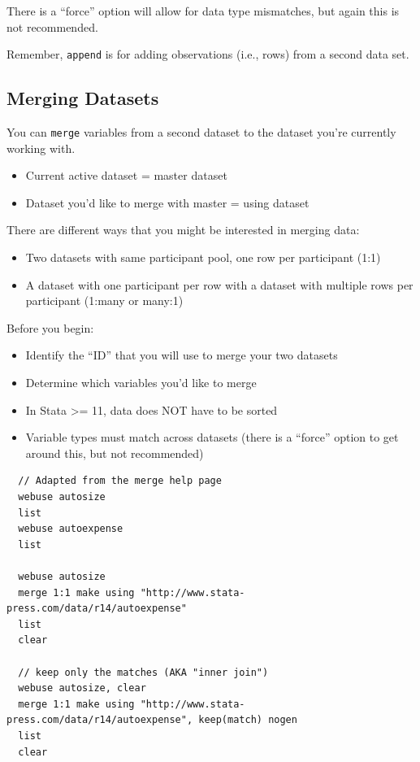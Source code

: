 \documentclass[]{book}
\providecommand{\tightlist}{%
  \setlength{\itemsep}{0pt}\setlength{\parskip}{0pt}}
\begin{document}
There is a ``force'' option will allow for data type mismatches, but
again this is not recommended.

Remember, \texttt{append} is for adding observations (i.e., rows) from a
second data set.

\subsection{Merging Datasets}\label{merging-datasets}

You can \texttt{merge} variables from a second dataset to the dataset
you're currently working with.

\begin{itemize}
\tightlist
\item
  Current active dataset = master dataset
\item
  Dataset you'd like to merge with master = using dataset
\end{itemize}

There are different ways that you might be interested in merging data:

\begin{itemize}
\tightlist
\item
  Two datasets with same participant pool, one row per participant (1:1)
\item
  A dataset with one participant per row with a dataset with multiple
  rows per participant (1:many or many:1)
\end{itemize}

Before you begin:

\begin{itemize}
\tightlist
\item
  Identify the ``ID'' that you will use to merge your two datasets
\item
  Determine which variables you'd like to merge
\item
  In Stata \textgreater{}= 11, data does NOT have to be sorted
\item
  Variable types must match across datasets (there is a ``force'' option
  to get around this, but not recommended)
\end{itemize}

\begin{verbatim}
  // Adapted from the merge help page
  webuse autosize 
  list
  webuse autoexpense
  list

  webuse autosize
  merge 1:1 make using "http://www.stata-press.com/data/r14/autoexpense"
  list
  clear

  // keep only the matches (AKA "inner join")
  webuse autosize, clear
  merge 1:1 make using "http://www.stata-press.com/data/r14/autoexpense", keep(match) nogen
  list
  clear
\end{verbatim}
\end{document}

